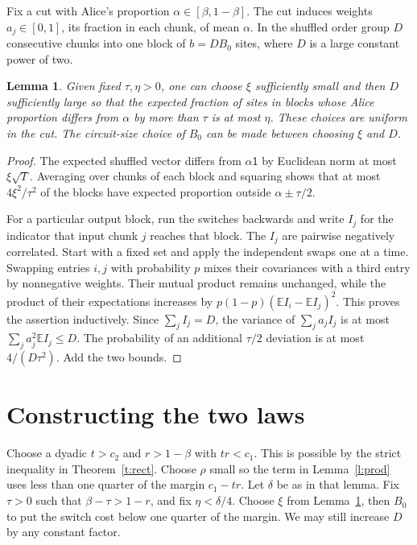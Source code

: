 \documentclass[11pt]{article}
\newtheorem{lemma}[theorem]{Lemma}
\newcommand{\E}{\mathbb E}
\begin{document}
Fix a cut with Alice's proportion $\alpha\in[\beta,1-\beta]$. The cut induces weights $a_j\in[0,1]$, its fraction in each chunk, of mean $\alpha$. In the shuffled order group $D$ consecutive chunks into one block of $b=DB_0$ sites, where $D$ is a large constant power of two.

\begin{lemma}\label{l:disperse}
Given fixed $\tau,\eta>0$, one can choose $\xi$ sufficiently small and then $D$ sufficiently large so that the expected fraction of sites in blocks whose Alice proportion differs from $\alpha$ by more than $\tau$ is at most $\eta$. These choices are uniform in the cut. The circuit-size choice of $B_0$ can be made between choosing $\xi$ and $D$.
\end{lemma}
\begin{proof}
The expected shuffled vector differs from $\alpha\mathsf{1}$ by Euclidean norm at most $\xi\sqrt T$. Averaging over chunks of each block and squaring shows that at most $4\xi^2/\tau^2$ of the blocks have expected proportion outside $\alpha\pm\tau/2$.

For a particular output block, run the switches backwards and write $I_j$ for the indicator that input chunk $j$ reaches that block. The $I_j$ are pairwise negatively correlated. Start with a fixed set and apply the independent swaps one at a time. Swapping entries $i,j$ with probability $p$ mixes their covariances with a third entry by nonnegative weights. Their mutual product remains unchanged, while the product of their expectations increases by $p(1-p)(\E I_i-\E I_j)^2$. This proves the assertion inductively. Since $\sum_j I_j=D$, the variance of $\sum_j a_j I_j$ is at most $\sum_j a_j^2\E I_j\le D$. The probability of an additional $\tau/2$ deviation is at most $4/(D\tau^2)$. Add the two bounds.
\end{proof}

\section{Constructing the two laws}

Choose a dyadic $t>c_2$ and $r>1-\beta$ with $tr<c_1$. This is possible by the strict inequality in Theorem~\ref{t:rect}. Choose $\rho$ small so the term in Lemma~\ref{l:prod} uses less than one quarter of the margin $c_1-tr$. Let $\delta$ be as in that lemma. Fix $\tau>0$ such that $\beta-\tau>1-r$, and fix $\eta<\delta/4$. Choose $\xi$ from Lemma~\ref{l:disperse}, then $B_0$ to put the switch cost below one quarter of the margin. We may still increase $D$ by any constant factor.
\end{document}
